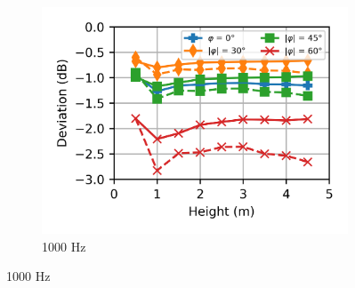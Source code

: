 \begin{figure}
\begin{subfigure}[b]{\textwidth}
		\hfill
		\includegraphics{fig/chap5/impedance/third_octave/deviation_1000_Hz.png}
		\caption{1000 Hz}
	\end{subfigure}
\end{figure}
